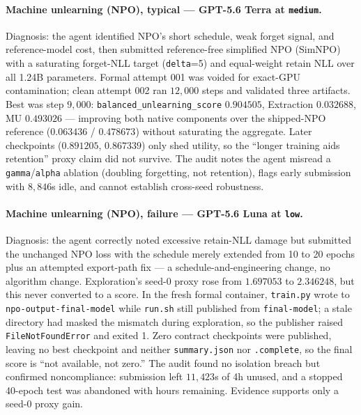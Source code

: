 \paragraph{Machine unlearning (NPO), typical --- GPT-5.6 Terra at \texttt{medium}.} Diagnosis: the agent identified NPO's short schedule, weak forget signal, and reference-model cost, then submitted reference-free simplified NPO (SimNPO) with a saturating forget-NLL target (\texttt{delta}=5) and equal-weight retain NLL over all 1.24B parameters. Formal attempt 001 was voided for exact-GPU contamination; clean attempt 002 ran $12{,}000$ steps and validated three artifacts. Best was step $9{,}000$: \texttt{balanced\_unlearning\_score} $0.904505$, Extraction $0.032688$, MU $0.493026$ --- improving both native components over the shipped-NPO reference ($0.063436$ / $0.478673$) without saturating the aggregate. Later checkpoints ($0.891205$, $0.867339$) only shed utility, so the ``longer training aids retention'' proxy claim did not survive. The audit notes the agent misread a \texttt{gamma}/\texttt{alpha} ablation (doubling forgetting, not retention), flags early submission with $8{,}846$s idle, and cannot establish cross-seed robustness.

\paragraph{Machine unlearning (NPO), failure --- GPT-5.6 Luna at \texttt{low}.} Diagnosis: the agent correctly noted excessive retain-NLL damage but submitted the unchanged NPO loss with the schedule merely extended from 10 to 20 epochs plus an attempted export-path fix --- a schedule-and-engineering change, no algorithm change. Exploration's seed-0 proxy rose from $1.697053$ to $2.346248$, but this never converted to a score. In the fresh formal container, \texttt{train.py} wrote to \texttt{npo-output-final-model} while \texttt{run.sh} still published from \texttt{final-model}; a stale directory had masked the mismatch during exploration, so the publisher raised \texttt{FileNotFoundError} and exited 1. Zero contract checkpoints were published, leaving no best checkpoint and neither \texttt{summary.json} nor \texttt{.complete}, so the final score is ``not available, not zero.'' The audit found no isolation breach but confirmed noncompliance: submission left $11{,}423$s of 4h unused, and a stopped 40-epoch test was abandoned with hours remaining. Evidence supports only a seed-0 proxy gain.

